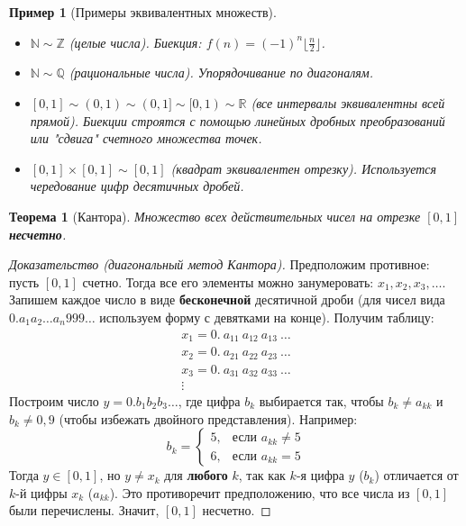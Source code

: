 \documentclass[a4paper, 12pt]{article}
\newtheorem{theorem}{Теорема}
\newtheorem{example}{Пример}
\newcommand{\R}{\mathbb{R}}
\newcommand{\N}{\mathbb{N}}
\newcommand{\Q}{\mathbb{Q}}
\newcommand{\Z}{\mathbb{Z}}
\newcommand{\1}{\mathbf{1}}
\begin{document}
\begin{example}[Примеры эквивалентных множеств]
    \hfill
    \begin{itemize}
        \item $\N \sim \Z$ (целые числа). Биекция: $f(n) = (-1)^n \lfloor \frac{n}{2} \rfloor$.
        \item $\N \sim \Q$ (рациональные числа). Упорядочивание по диагоналям.
        \item $[0, 1] \sim (0, 1) \sim (0, 1] \sim [0, 1) \sim \R$ (все интервалы эквивалентны всей прямой). Биекции строятся с помощью линейных дробных преобразований или "сдвига" счетного множества точек.
        \item $[0, 1] \times [0, 1] \sim [0, 1]$ (квадрат эквивалентен отрезку). Используется чередование цифр десятичных дробей.
    \end{itemize}
\end{example}

\begin{theorem}[Кантора]
    Множество всех действительных чисел на отрезке $[0,1]$ \textbf{несчетно}.
\end{theorem}

\begin{proof}[Доказательство (диагональный метод Кантора)]
    Предположим противное: пусть $[0,1]$ счетно. Тогда все его элементы можно занумеровать: $x_1, x_2, x_3, \dots$. Запишем каждое число в виде \textbf{бесконечной} десятичной дроби (для чисел вида $0.a_1a_2\dots a_n999\dots$ используем форму с девятками на конце). Получим таблицу:
    \[
    \begin{array}{c}
    x_1 = 0.\ a_{11}\ a_{12}\ a_{13}\ \dots \\
    x_2 = 0.\ a_{21}\ a_{22}\ a_{23}\ \dots \\
    x_3 = 0.\ a_{31}\ a_{32}\ a_{33}\ \dots \\
    \vdots
    \end{array}
    \]
    Построим число $y = 0.b_1b_2b_3\dots$, где цифра $b_k$ выбирается так, чтобы $b_k \neq a_{kk}$ и $b_k \neq 0, 9$ (чтобы избежать двойного представления). Например:
    \[
    b_k = \begin{cases}
        5, & \text{если } a_{kk} \neq 5 \\
        6, & \text{если } a_{kk} = 5
    \end{cases}
    \]
    Тогда $y \in [0,1]$, но $y \neq x_k$ для \textbf{любого} $k$, так как $k$-я цифра $y$ ($b_k$) отличается от $k$-й цифры $x_k$ ($a_{kk}$). Это противоречит предположению, что все числа из $[0,1]$ были перечислены. Значит, $[0,1]$ несчетно.
\end{proof}
\end{document}

